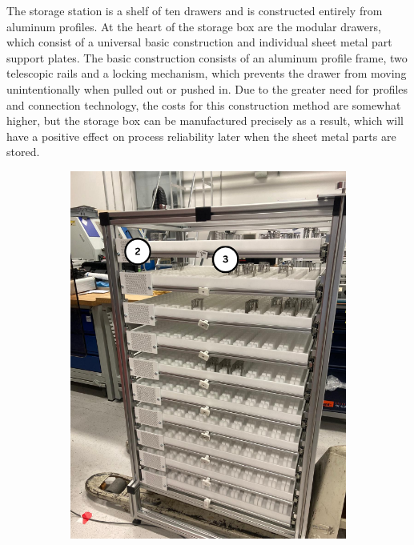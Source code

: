 The storage station is a shelf of ten drawers and is constructed entirely from aluminum profiles.
At the heart of the storage box are the modular drawers, which consist of a universal basic
construction and individual sheet metal part support plates. The basic construction consists
of an aluminum profile frame, two telescopic rails and a locking mechanism, which prevents the
drawer from moving unintentionally when pulled out or pushed in. Due to the greater need for profiles and
connection technology, the costs for this construction method are somewhat higher, but the storage
box can be manufactured precisely as a result, which will have a positive effect on process reliability
later when the sheet metal parts are stored.

\begin{figure}[h]
    \centering
    \begin{subfigure}{0.35\textwidth}
        \centering
        \includegraphics[width=\textwidth]{figures/storage-station-front.png} %

\end{subfigure}
\end{figure}
